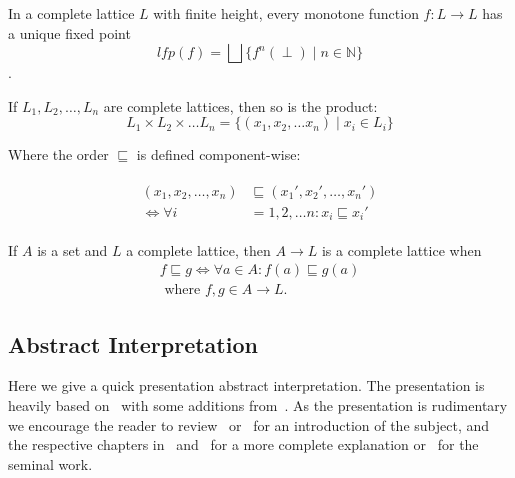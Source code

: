 \begin{theorem}\label{thm:kleene_finite}
    In a complete lattice $L$ with finite height, every monotone function $f : L \rightarrow L$ has a unique fixed point
    \begin{equation}
        lfp(f) = \bigsqcup\{f^n(\perp) \mid n \in \mathbb{N}\}
    \end{equation}.
\end{theorem}


\begin{theorem}
    If $L_1, L_2, \dots, L_n$ are complete lattices, then so is the product:
    \begin{equation}
        L_1 \times L_2 \times \dots L_n = \{(x_1, x_2, \dots x_n) \mid x_i \in L_i\}
    \end{equation}

    Where the order $\sqsubseteq$ is defined component-wise:

    \begin{align}
        \begin{split}
        (x_1, x_2, \dots, x_n) &\sqsubseteq (x_1', x_2', \dots, x_n') \\
        \iff
        \forall i &= 1, 2, \dots n : x_i \sqsubseteq x_i'
        \end{split}
    \end{align}
\end{theorem}

\begin{theorem}
    If $A$ is a set and $L$ a complete lattice, then $A \rightarrow L$ is a complete lattice when
    \begin{equation}
    \begin{split}
        f \sqsubseteq g \iff \forall a \in A : f(a) \sqsubseteq g(a) \\ \text{ where } f,g \in A \rightarrow L.\label{eq:equation-complete-lattice-theorem}
    \end{split}
    \end{equation}
\end{theorem}


\subsection{Abstract Interpretation}\label{subsec:abstract-interpretation1}
Here we give a quick presentation abstract interpretation.
The presentation is heavily based on~\cite{nielson_formal_2019} with some additions from~\cite{moller_statitc_nodate}.
As the presentation is rudimentary we encourage the reader to review~\cite{noauthor_abstract_nodate} or~\cite{cousot_abstract_1996} for an introduction of the subject, and the respective chapters in~\cite{nielson_formal_2019} and~\cite{moller_statitc_nodate} for a more complete explanation or~\cite{cousot_abstract_1977} for the seminal work.


